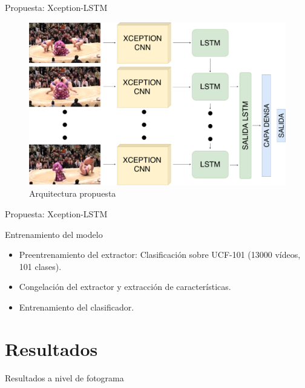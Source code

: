 \documentclass[10pt]{beamer}
\begin{document}
\begin{frame}{Propuesta: Xception-LSTM}
  \begin{figure}
    \centering
    \includegraphics[width=.8\textwidth]{images/proposal.pdf}
    \caption{Arquitectura propuesta}
  \end{figure}
\end{frame}

\begin{frame}{Propuesta: Xception-LSTM}
  \begin{block}{Entrenamiento del modelo}
    \begin{itemize}
    \item Preentrenamiento del extractor: Clasificación sobre UCF-101
      (13000 vídeos, 101 clases).
    \item Congelación del extractor y extracción de características.
    \item Entrenamiento del clasificador.
    \end{itemize}
  \end{block}
\end{frame}

\section{Resultados}

\begin{frame}{Resultados a nivel de fotograma}
  \begin{table}[H]
    \centering
    \caption{Tabla de resultados obtenidos por los modelos.}
    \label{tab:confusion-matrices}
  \end{table}
\end{frame}
\end{document}
